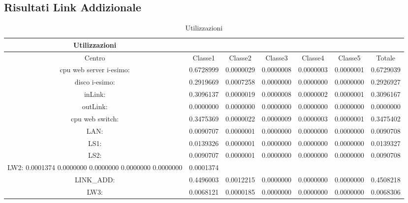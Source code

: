 \subsection{Risultati Link Addizionale}
\begin{table}[htbp]
\begin{center}
\begin{tabular}{||c|c|c|c|c|c|c||}
\hline
Utilizzazioni\\
\hline
Centro &Classe1 &Classe2 &Classe3 &Classe4 &Classe5 &Totale\\
\hline
\hline
 cpu web server i-esimo: 	&0.6728999	&0.0000029	&0.0000008	&0.0000003	&0.0000001	&0.6729039\\
\hline
 disco i-esimo: 	&0.2919669	&0.0007258	&0.0000000	&0.0000000	&0.0000000	&0.2926927\\
\hline
 inLink: 	&0.3096137	&0.0000019	&0.0000008	&0.0000002	&0.0000001	&0.3096167\\
\hline
 outLink: 	&0.0000000	&0.0000000	&0.0000000	&0.0000000	&0.0000000	&0.0000000\\
\hline
 cpu web switch: 	&0.3475369	&0.0000022	&0.0000009	&0.0000003	&0.0000001	&0.3475402\\
\hline
 LAN: 	&0.0090707	&0.0000001	&0.0000000	&0.0000000	&0.0000000	&0.0090708\\
\hline
 LS1: 	&0.0139326	&0.0000001	&0.0000000	&0.0000000	&0.0000000	&0.0139327\\
\hline
 LS2:	&0.0090707	&0.0000001	&0.0000000	&0.0000000	&0.0000000	&0.0090708\\
\hline
 LW2: 	0.0001374	0.0000000	0.0000000	0.0000000	0.0000000	&0.0001374\\
\hline
 LINK_ADD: 	&0.4496003	&0.0012215	&0.0000000	&0.0000000	&0.0000000	&0.4508218\\
\hline
 LW3: 	&0.0068121	&0.0000185	&0.0000000	&0.0000000	&0.0000000	&0.0068306\\
\hline
\end{tabular}
\end{center}
\caption{Utilizzazioni}
\label{utilizzazioni}
\end{table}

